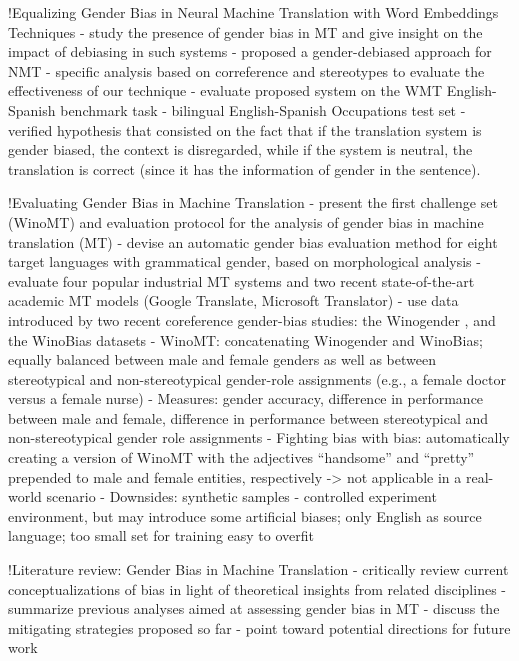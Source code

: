 !Equalizing Gender Bias in Neural Machine Translation
with Word Embeddings Techniques \parencite{Escud_Font_2019}
- study the presence of gender bias in MT and give insight on
the impact of debiasing in such systems
- proposed a gender-debiased approach for NMT
- specific analysis based on correference and stereotypes to evaluate the effectiveness of our technique
- evaluate proposed system on the WMT English-Spanish benchmark task
- bilingual English-Spanish Occupations test set
- verified hypothesis that consisted on the fact that if the translation system is gender biased, the context is disregarded, while if the system is neutral, the translation is correct (since it has the information of gender in the sentence).

!Evaluating Gender Bias in Machine Translation \parencite{Stanovsky_2019}
- present the first challenge set (WinoMT) and evaluation protocol for the analysis of gender bias in machine translation (MT)
- devise an automatic gender bias evaluation method for eight target languages with grammatical gender, based on morphological analysis
- evaluate  four popular industrial MT systems and two recent state-of-the-art academic MT models (Google Translate, Microsoft Translator)
- use data introduced by two recent coreference gender-bias studies: the
Winogender \parencite{Rudinger_2018_coreference}, and the WinoBias \cite{Zhao_2018_coreference} datasets
- WinoMT: concatenating Winogender and WinoBias; equally balanced between male and female genders as well as between stereotypical and non-stereotypical gender-role assignments (e.g., a female doctor versus a female nurse)
- Measures: gender accuracy, difference in performance between male and female, difference in performance between stereotypical and non-stereotypical gender role assignments
- Fighting bias with bias: automatically creating a version of WinoMT with the adjectives “handsome” and “pretty” prepended to male and female entities, respectively -> not applicable in a real-world scenario
- Downsides: synthetic samples - controlled experiment environment, but may introduce some artificial biases; only English as source language; too small set for training easy to overfit

!Literature review: Gender Bias in Machine Translation \parencite{Savoldi_2021}
- critically review current conceptualizations of bias in light of theoretical insights from related disciplines
- summarize previous analyses aimed at assessing gender bias in MT
- discuss the mitigating strategies proposed so far
- point toward potential directions for future work


